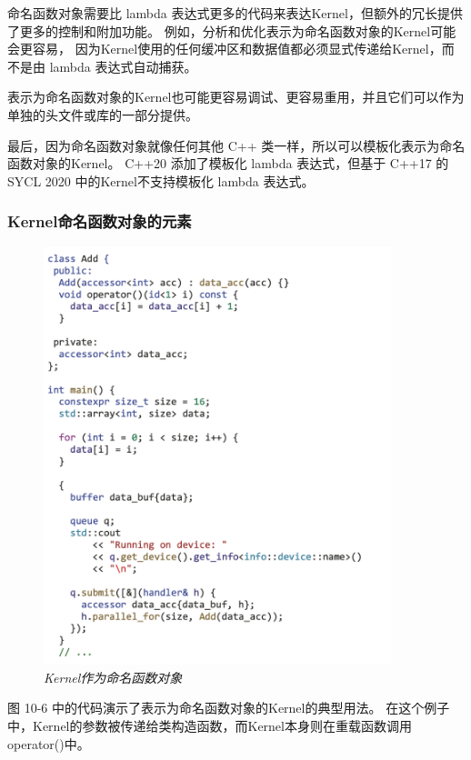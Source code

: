 命名函数对象需要比 lambda 表达式更多的代码来表达Kernel，但额外的冗长提供了更多的控制和附加功能。 
例如，分析和优化表示为命名函数对象的Kernel可能会更容易，
因为Kernel使用的任何缓冲区和数据值都必须显式传递给Kernel，而不是由 lambda 表达式自动捕获。

表示为命名函数对象的Kernel也可能更容易调试、更容易重用，并且它们可以作为单独的头文件或库的一部分提供。

最后，因为命名函数对象就像任何其他 C++ 类一样，所以可以模板化表示为命名函数对象的Kernel。 
C++20 添加了模板化 lambda 表达式，但基于 C++17 的 SYCL 2020 中的Kernel不支持模板化 lambda 表达式。

\subsubsection{Kernel命名函数对象的元素}
\begin{figure}[H]
	\centering
	\includegraphics[width=0.9\textwidth]{figs/F10.6.png}
	\caption{\textit{Kernel作为命名函数对象 }}
\end{figure}

图 10-6 中的代码演示了表示为命名函数对象的Kernel的典型用法。 
在这个例子中，Kernel的参数被传递给类构造函数，而Kernel本身则在重载函数调用operator()中。

